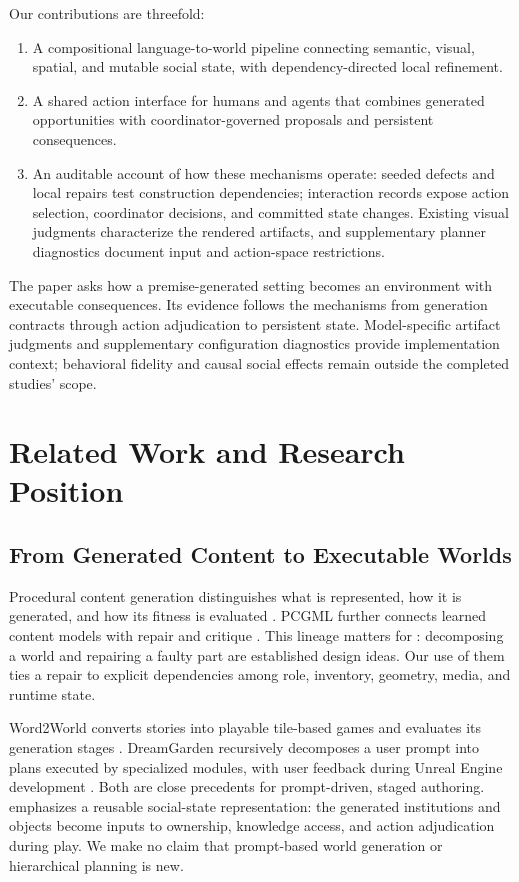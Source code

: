 Our contributions are threefold:
\begin{enumerate}
\setlength{\itemsep}{2pt}\setlength{\parskip}{0pt}
\item A compositional language-to-world pipeline connecting semantic, visual,
spatial, and mutable social state, with dependency-directed local refinement.
\item A shared action interface for humans and agents that combines generated
opportunities with coordinator-governed proposals and persistent consequences.
\item An auditable account of how these mechanisms operate: seeded defects
and local repairs test construction dependencies; interaction records expose
action selection, coordinator decisions, and committed state changes. Existing
visual judgments characterize the rendered artifacts, and supplementary
planner diagnostics document input and action-space restrictions.
\end{enumerate}

The paper asks how a premise-generated setting becomes an environment with
executable consequences. Its evidence follows the mechanisms from generation
contracts through action adjudication to persistent state. Model-specific
artifact judgments and supplementary configuration diagnostics provide
implementation context; behavioral fidelity and causal social effects remain
outside the completed studies' scope.

\section{Related Work and Research Position}
\label{sec:related}

\subsection{From Generated Content to Executable Worlds}
Procedural content generation distinguishes what is represented, how it is
generated, and how its fitness is evaluated \cite{togelius2011}. PCGML further
connects learned content models with repair and critique \cite{pcgml}. This
lineage matters for \agora: decomposing a world and repairing a faulty part are
established design ideas. Our use of them ties a repair to explicit dependencies
among role, inventory, geometry, media, and runtime state.

Word2World converts stories into playable tile-based games and evaluates its
generation stages \cite{word2world}. DreamGarden recursively decomposes a user
prompt into plans executed by specialized modules, with user feedback during
Unreal Engine development \cite{dreamgarden}. Both are close precedents for
prompt-driven, staged authoring. \agora emphasizes a reusable social-state
representation: the generated institutions and objects become inputs to
ownership, knowledge access, and action adjudication during play. We make no
claim that prompt-based world generation or hierarchical planning is new.

